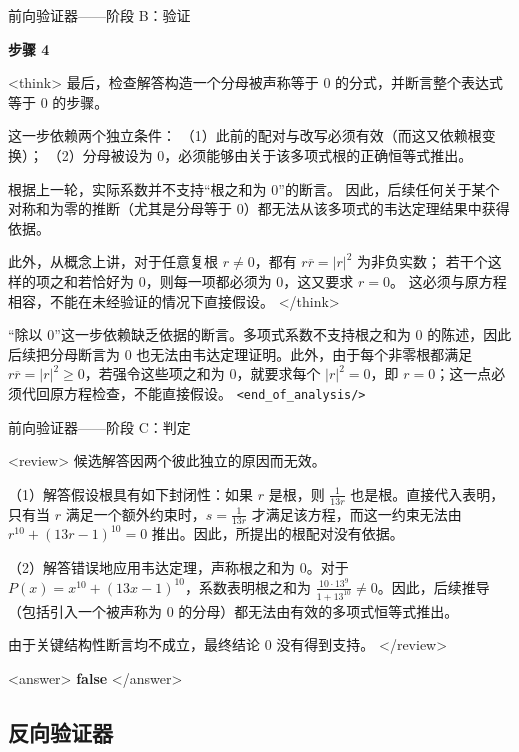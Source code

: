 \documentclass[11pt]{article}
\begin{document}
\begin{exbox}{前向验证器——阶段 B：验证}

\textbf{步骤 4}

<think>
最后，检查解答构造一个分母被声称等于 \(0\) 的分式，并断言整个表达式等于 \(0\) 的步骤。

这一步依赖两个独立条件：
（1）此前的配对与改写必须有效（而这又依赖根变换）；
（2）分母被设为 \(0\)，必须能够由关于该多项式根的正确恒等式推出。

根据上一轮，实际系数并不支持“根之和为 0”的断言。
因此，后续任何关于某个对称和为零的推断（尤其是分母等于 \(0\)）都无法从该多项式的韦达定理结果中获得依据。

此外，从概念上讲，对于任意复根 \(r\neq 0\)，都有 \(r\overline{r}=|r|^2\) 为非负实数；
若干个这样的项之和若恰好为 \(0\)，则每一项都必须为 \(0\)，这又要求 \(r=0\)。
这必须与原方程相容，不能在未经验证的情况下直接假设。
</think>

“除以 0”这一步依赖缺乏依据的断言。多项式系数不支持根之和为 \(0\) 的陈述，因此后续把分母断言为 \(0\) 也无法由韦达定理证明。此外，由于每个非零根都满足 \(r\overline{r}=|r|^2\ge 0\)，若强令这些项之和为 \(0\)，就要求每个 \(|r|^2=0\)，即 \(r=0\)；这一点必须代回原方程检查，不能直接假设。
\texttt{<end\_of\_analysis/>}

\end{exbox}
\begin{exbox}{前向验证器——阶段 C：判定}

<review>
候选解答因两个彼此独立的原因而无效。

（1）解答假设根具有如下封闭性：如果 \(r\) 是根，则 \(\frac{1}{13r}\) 也是根。直接代入表明，只有当 \(r\) 满足一个额外约束时，\(s=\frac{1}{13r}\) 才满足该方程，而这一约束无法由 \(r^{10}+(13r-1)^{10}=0\) 推出。因此，所提出的根配对没有依据。

（2）解答错误地应用韦达定理，声称根之和为 \(0\)。对于 \(P(x)=x^{10}+(13x-1)^{10}\)，系数表明根之和为 \(\frac{10\cdot 13^9}{1+13^{10}}\neq 0\)。因此，后续推导（包括引入一个被声称为 \(0\) 的分母）都无法由有效的多项式恒等式推出。

由于关键结构性断言均不成立，最终结论 \(0\) 没有得到支持。
</review>

<answer>
\textbf{false}
</answer>

\end{exbox}

\subsection{反向验证器}
\end{document}
